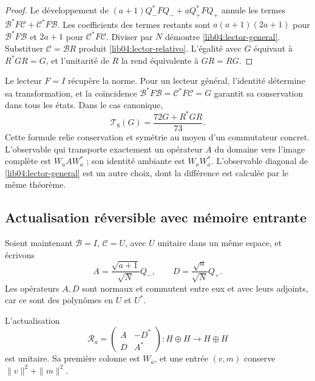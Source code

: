 \begin{proof}
Le développement de \((a+1)Q_-^*FQ_-+aQ_+^*FQ_+\) annule les termes \(\mathcal B^*F\mathcal C+\mathcal C^*F\mathcal B\). Les coefficients des termes restants sont \(a(a+1)(2a+1)\) pour \(\mathcal B^*F\mathcal B\) et \(2a+1\) pour \(\mathcal C^*F\mathcal C\). Diviser par \(N\) démontre \eqref{lib04:lector-general}. Substituer \(\mathcal C=\mathcal BR\) produit \eqref{lib04:lector-relativo}. L'égalité avec \(G\) équivaut à \(R^*GR=G\), et l'unitarité de \(R\) la rend équivalente à \(GR=RG\).
\end{proof}

Le lecteur \(F=I\) récupère la norme. Pour un lecteur général,
l’identité détermine sa transformation, et la coïncidence
\(\mathcal B^*F\mathcal B=\mathcal C^*F\mathcal C=G\) garantit
sa conservation dans tous les états. Dans le cas canonique,
\begin{equation}
 \mathcal T_8(G)=\frac{72G+R^*GR}{73}.
 \label{lib04:lector-72}
\end{equation}
Cette formule relie conservation et symétrie au moyen d’un commutateur
concret. L’observable qui transporte exactement un opérateur
\(A\) du domaine vers l’image complète est \(W_aAW_a^*\) ; son
identité ambiante est \(W_aW_a^*\). L’observable diagonal de
\eqref{lib04:lector-general} est un autre choix, dont la différence est
calculée par le même théorème.

\subsection{Actualisation réversible avec mémoire entrante}
\label{lib04:reentrada}

Soient maintenant \(\mathcal B=I\), \(\mathcal C=U\), avec \(U\)
unitaire dans un même espace, et écrivons
\begin{equation}
 A=\frac{\sqrt{a+1}}{\sqrt N}Q_-,\qquad
 D=\frac{\sqrt a}{\sqrt N}Q_+.
 \label{lib04:ad}
\end{equation}
Les opérateurs \(A,D\) sont normaux et commutent entre eux et avec leurs adjoints, car ce sont des polynômes en \(U\) et \(U^*\).

\begin{theorem}
\label{lib04:teo-unitaria}
L’actualisation
\begin{equation}
 \mathscr R_a=
 \begin{pmatrix}A&-D^*\\D&A^*\end{pmatrix}:H\oplus H\to H\oplus H
 \label{lib04:unitaria}
\end{equation}
est unitaire. Sa première colonne est \(W_a\), et une entrée
\((v,m)\) conserve \(\|v\|^2+\|m\|^2\).
\end{theorem}


